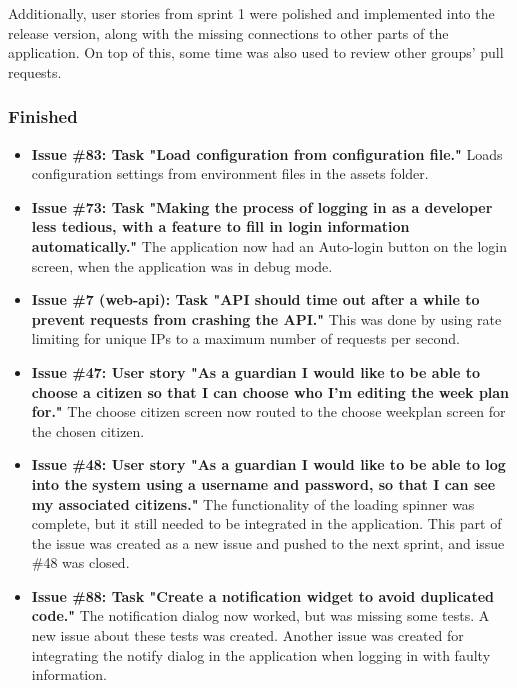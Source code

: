 Additionally, user stories from sprint 1 were polished and implemented into the release version, along with the missing connections to other parts of the application. On top of this, some time was also used to review other groups' pull requests.

\subsubsection{Finished}
\begin{itemize}
    \item \textbf{Issue \#83: Task "Load configuration from configuration file."}
        \subitem Loads configuration settings from environment files in the assets folder.
    \item \textbf{Issue \#73: Task "Making the process of logging in as a developer less tedious, with a feature to fill in login information automatically."}
        \subitem The application now had an Auto-login button on the login screen, when the application was in debug mode.
    \item \textbf{Issue \#7 (web-api): Task "API should time out after a while to prevent requests from crashing the API."}
        \subitem This was done by using rate limiting for unique IPs to a maximum number of requests per second. 
    \item \textbf{Issue \#47: User story "As a guardian I would like to be able to choose a citizen so that I can choose who I’m editing the week plan for."}
        \subitem The choose citizen screen now routed to the choose weekplan screen for the chosen citizen.
    \item \textbf{Issue \#48: User story "As a guardian I would like to be able to log into the system using a username and password, so that I can see my associated citizens."}
        \subitem The functionality of the loading spinner was complete, but it still needed to be integrated in the application. This part of the issue was created as a new issue and pushed to the next sprint, and issue \#48 was closed.
    \item \textbf{Issue \#88: Task "Create a notification widget to avoid duplicated code."}
    \subitem The notification dialog now worked, but was missing some tests. A new issue about these tests was created.
    \subitem Another issue was created for integrating the notify dialog in the application when logging in with faulty information.
\end{itemize}

